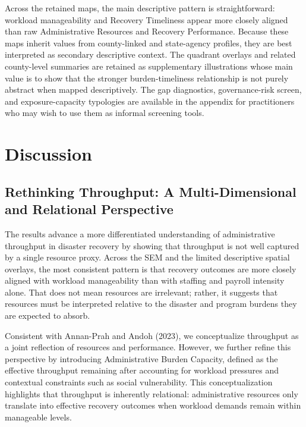 \documentclass[
  number]{elsarticle}
\begin{document}
Across the retained maps, the main descriptive pattern is
straightforward: workload manageability and Recovery Timeliness appear
more closely aligned than raw Administrative Resources and Recovery
Performance. Because these maps inherit values from county-linked and
state-agency profiles, they are best interpreted as secondary
descriptive context. The quadrant overlays and related county-level
summaries are retained as supplementary illustrations whose main value
is to show that the stronger burden-timeliness relationship is not
purely abstract when mapped descriptively. The gap diagnostics,
governance-risk screen, and exposure-capacity typologies are available
in the appendix for practitioners who may wish to use them as informal
screening tools.

\section{Discussion}\label{discussion}

\subsection{Rethinking Throughput: A Multi-Dimensional and Relational
Perspective}\label{rethinking-throughput-a-multi-dimensional-and-relational-perspective}

The results advance a more differentiated understanding of
administrative throughput in disaster recovery by showing that
throughput is not well captured by a single resource proxy. Across the
SEM and the limited descriptive spatial overlays, the most consistent
pattern is that recovery outcomes are more closely aligned with workload
manageability than with staffing and payroll intensity alone. That does
not mean resources are irrelevant; rather, it suggests that resources
must be interpreted relative to the disaster and program burdens they
are expected to absorb.

Consistent with Annan-Prah and Andoh (2023), we conceptualize throughput
as a joint reflection of resources and performance. However, we further
refine this perspective by introducing Administrative Burden Capacity,
defined as the effective throughput remaining after accounting for
workload pressures and contextual constraints such as social
vulnerability. This conceptualization highlights that throughput is
inherently relational: administrative resources only translate into
effective recovery outcomes when workload demands remain within
manageable levels.
\end{document}
